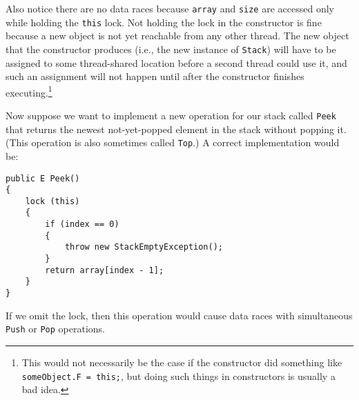 \documentclass[10pt]{article}
\begin{document}
Also notice there are no data races because {\tt array} and {\tt size}
are accessed only while holding the {\tt this} lock.  Not holding the
lock in the constructor is fine because a new object is not yet
reachable from any other thread.  The new object that the constructor
produces (i.e., the new instance of {\tt Stack}) will
have to be assigned to some thread-shared location before a second
thread could use it, and such an assignment will not happen until
after the constructor finishes executing.\footnote{This would not
  necessarily be the case if the constructor did something like 
  {\tt someObject.F = this;}, but doing such things in constructors is
  usually a bad idea.}

Now suppose we want to implement a new operation for our stack called
{\tt Peek} that returns the newest
not-yet-popped element in the stack without popping it.  (This
operation is also sometimes called {\tt Top}.) A correct
implementation would be:
\begin{verbatim}
public E Peek()
{
    lock (this)
    {
        if (index == 0)
        {
            throw new StackEmptyException();
        }
        return array[index - 1];
    }
}
\end{verbatim}
If we omit the lock, then this operation would
cause data races with simultaneous {\tt Push} or {\tt Pop} operations.
\end{document}
